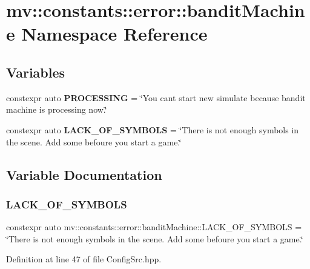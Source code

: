 \section{mv\+:\+:constants\+:\+:error\+:\+:bandit\+Machine Namespace Reference}
\label{namespacemv_1_1constants_1_1error_1_1bandit_machine}
\subsection*{Variables}
\begin{DoxyCompactItemize}
\item 
constexpr auto \textbf{ P\+R\+O\+C\+E\+S\+S\+I\+NG} = \char`\"{}You can\textquotesingle{}t start new simulate because bandit machine is processing now.\char`\"{}
\item 
constexpr auto \textbf{ L\+A\+C\+K\+\_\+\+O\+F\+\_\+\+S\+Y\+M\+B\+O\+LS} = \char`\"{}There is not enough symbols in the scene. Add some befoure you start a game.\char`\"{}
\end{DoxyCompactItemize}


\subsection{Variable Documentation}
\mbox{\label{namespacemv_1_1constants_1_1error_1_1bandit_machine_a9c087557a47893324cbe9cc76ebcfe81}} 
\subsubsection{L\+A\+C\+K\+\_\+\+O\+F\+\_\+\+S\+Y\+M\+B\+O\+LS}
{\footnotesize\ttfamily constexpr auto mv\+::constants\+::error\+::bandit\+Machine\+::\+L\+A\+C\+K\+\_\+\+O\+F\+\_\+\+S\+Y\+M\+B\+O\+LS = \char`\"{}There is not enough symbols in the scene. Add some befoure you start a game.\char`\"{}}



Definition at line 47 of file Config\+Src.\+hpp.

\mbox{\label{namespacemv_1_1constants_1_1error_1_1bandit_machine_a79054aaefbc11a8f3cea2b8695bc63c2}} 
